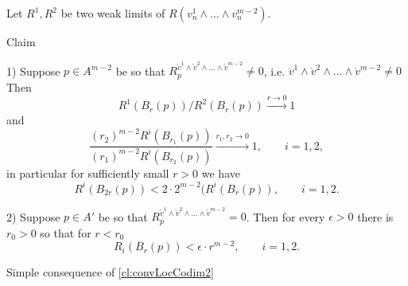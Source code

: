 Let $R^1, R^2$ be two weak limits
of  $R(v^1_n\wedge\dots\wedge v^{m-2}_n )$.

\begin{thm}{Claim}\label{cl:R12loc}


1) Suppose $p\in A^{m-2}$ be so that $R_p^{\mathring{v}^1\wedge \mathring{v}^2\wedge\dots\wedge \mathring{v}^{m-2}}\neq 0$, i.e.
$\mathring{v}^1\wedge \mathring{v}^2\wedge\dots\wedge \mathring{v}^{m-2}\neq 0$
Then
$$R^1(B_{r}(p))/R^2(B_{r}(p))\xrightarrow{r\to 0} 1$$
and
$$\frac{(r_2)^{m-2}R^i(B_{r_1}(p))}{(r_1)^{m-2}R^i(B_{r_2}(p))}\xrightarrow{r_1, r_2\to 0} 1, \qquad i=1, 2,$$
in particular for sufficiently small $r>0$
we have
$$ R^i(B_{2r}(p))<2\cdot 2^{m-2}(R^i(B_r(p)),\qquad i=1, 2.$$

2) Suppose $p\in A'$ be so that $R_p^{\mathring{v}^1\wedge \mathring{v}^2\wedge\dots\wedge \mathring{v}^{m-2}}= 0$.
Then for every $\epsilon>0$ there is $r_0>0$ so that
for $r<r_0$
$$ R_i(B_{r}(p))<\epsilon\cdot r^{m-2},\qquad i=1, 2.$$
\end{thm}

 Simple consequence of \ref{cl:convLocCodim2} \qeds
